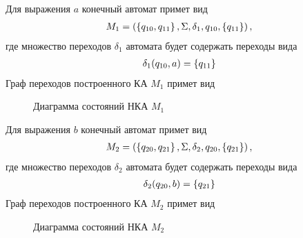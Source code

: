 Для выражения \(a\) конечный автомат примет вид
\begin{align*}
	M_1 = \left(\left\{q_{10}, q_{11}\right\}, \Sigma, \delta_1, q_{10}, \left\{q_{11}\right\}\right),
\end{align*}
где множество переходов \(\delta_1\) автомата будет содержать переходы вида
\begin{align*}
	\delta_1(q_{10}, a) = \left\{q_{11}\right\}
\end{align*}
Граф переходов построенного КА \(M_1\) примет вид
\begin{figure}[h!]
	\centering
	\caption{Диаграмма состояний НКА \(M_1\)}
\end{figure}

Для выражения \(b\) конечный автомат примет вид
\begin{align*}
	M_2 = \left(\left\{q_{20}, q_{21}\right\}, \Sigma, \delta_2, q_{20}, \left\{q_{21}\right\}\right),
\end{align*}
где множество переходов \(\delta_2\) автомата будет содержать переходы вида
\begin{align*}
	\delta_2(q_{20}, b) = \left\{q_{21}\right\}
\end{align*}
Граф переходов построенного КА \(M_2\) примет вид
\begin{figure}[h!]
	\centering
	\caption{Диаграмма состояний НКА \(M_2\)}
\end{figure}

